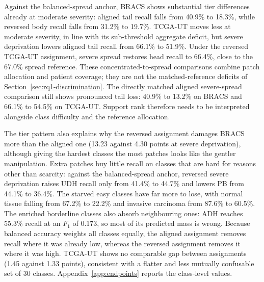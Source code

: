 \documentclass[11pt]{article}
\newcommand{\resultstable}[1]{}
\begin{document}
\begin{table}[ht]
  \centering
  \footnotesize
  \resultstable{tier_endpoints_summary}
  \caption{Selected tier recall (\%). Aligned assigns the fewest patches to the hardest classes; reversed assigns those classes the most patches. Head, body, and tail denote high-, intermediate-, and low-support tiers.}
  \label{tab:tier-endpoints}
\end{table}

\noindent Against the balanced-spread anchor, BRACS shows substantial tier differences already at moderate severity: aligned tail recall falls from \num{40.9}\% to \num{18.3}\%, while reversed body recall falls from \num{31.2}\% to \num{19.7}\%. TCGA-UT moves less at moderate severity, in line with its sub-threshold aggregate deficit, but severe deprivation lowers aligned tail recall from \num{66.1}\% to \num{51.9}\%. Under the reversed TCGA-UT assignment, severe spread restores head recall to \num{66.4}\%, close to the \num{67.0}\% spread reference. These concentrated-to-spread comparisons combine patch allocation and patient coverage; they are not the matched-reference deficits of Section~\ref{sec:rq1-discrimination}. The directly matched aligned severe-spread comparison still shows pronounced tail loss: \num{40.9}\% to \num{13.2}\% on BRACS and \num{66.1}\% to \num{54.5}\% on TCGA-UT. Support rank therefore needs to be interpreted alongside class difficulty and the reference allocation.

The tier pattern also explains why the reversed assignment damages BRACS more than the aligned one (\num{13.23} against \num{4.30} points at severe deprivation), although giving the hardest classes the most patches looks like the gentler manipulation. Extra patches buy little recall on classes that are hard for reasons other than scarcity: against the balanced-spread anchor, reversed severe deprivation raises UDH recall only from \num{41.4}\% to \num{44.7}\% and lowers PB from \num{44.1}\% to \num{36.4}\%. The starved easy classes have far more to lose, with normal tissue falling from \num{67.2}\% to \num{22.2}\% and invasive carcinoma from \num{87.6}\% to \num{60.5}\%. The enriched borderline classes also absorb neighbouring ones: ADH reaches \num{55.3}\% recall at an $F_1$ of \num{0.173}, so most of its predicted mass is wrong. Because balanced accuracy weights all classes equally, the aligned assignment removes recall where it was already low, whereas the reversed assignment removes it where it was high. TCGA-UT shows no comparable gap between assignments (\num{1.45} against \num{1.33} points), consistent with a flatter and less mutually confusable set of 30 classes. Appendix~\ref{app:endpoints} reports the class-level values.
\end{document}
